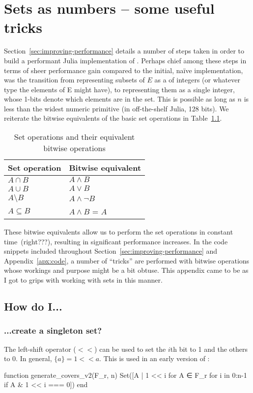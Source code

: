 \chapter{Sets as numbers -- some useful tricks}
Section~\ref{sec:improving-performance} details a number of steps taken in order to build a performant Julia implementation of . Perhaps chief among these steps in terms of sheer performance gain compared to the initial, naïve implementation, was the transition from representing subsets of $E$ as a  of integers (or whatever type the elements of E might have), to representing them as a single integer, whose 1-bits denote which elements are in the set. This is possible as long as $n$ is less than the widest numeric primitive (in off-the-shelf Julia, 128 bits). We reiterate the bitwise equivalents of the basic set operations in Table~\ref{tab:equiv-bitwise}.
\begin{table}[!ht]
  \caption{Set operations and their equivalent bitwise operations}
  \label{tab:equiv-bitwise}
  \centering
  \begin{tabular}{|l|l|}
  \hline
      Set operation   & Bitwise equivalent   \\\hline
      $A \cap B$      & $A \land B$       \\\hline
      $A \cup B$      & $A \lor B$        \\\hline
      $A \setminus B$ & $A \land \lnot B$   \\\hline
      $A \subseteq B$ & $A \land B$ = $A$ \\\hline
  \end{tabular}
\end{table}
These bitwise equivalents allow us to perform the set operations in constant time~(right???), resulting in significant performance increases. In the code snippets included throughout Section~\ref{sec:improving-performance} and Appendix~\ref{apx:code}, a number of ``tricks'' are performed with bitwise operations whose workings and purpose might be a bit obtuse. This appendix came to be as I got to grips with working with sets in this manner.

\section{How do I...}
\subsection{...create a singleton set?}
The left-shift operator ($<<$) can be used to set the $i$th bit to 1 and the others to 0. In general, $\{a\} = 1<<a$. This is used in an early version of :
\begin{jllisting}
function generate_covers_v2(F_r, n)
  Set([A | 1 << i for A ∈ F_r for i in 0:n-1 if A & 1 << i === 0])
end
\end{jllisting}

